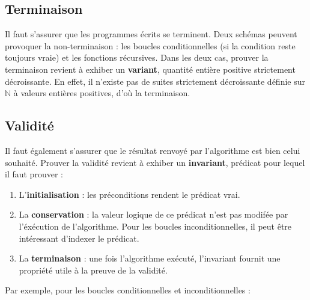 \documentclass{hibiscus}
\begin{document}
\subsection{Terminaison}

\par Il faut s'assurer que les programmes écrits se terminent. Deux schémas peuvent provoquer la non-terminaison : les boucles conditionnelles (si la condition reste toujours vraie) et les fonctions récursives. Dans les deux cas, prouver la terminaison revient à exhiber un \textbf{variant}, quantité entière positive strictement décroissante. En effet, il n'existe pas de suites strictement décroissante définie sur $\mathbb{N}$ à valeurs entières positives, d'où la terminaison.

\subsection{Validité}

Il faut également s'assurer que le résultat renvoyé par l'algorithme est bien celui souhaité. Prouver la validité revient à exhiber un \textbf{invariant}, prédicat pour lequel il faut prouver :

\medskip \begin{enumerate}
\item L'\textbf{initialisation} : les préconditions rendent le prédicat vrai.
\item La \textbf{conservation} : la valeur logique de ce prédicat n'est pas modifée par l'éxécution de l'algorithme. Pour les boucles inconditionnelles, il peut être intéressant d'indexer le prédicat.
\item La \textbf{terminaison} : une fois l'algorithme exécuté, l'invariant fournit une propriété utile à la preuve de la validité.
\end{enumerate}

\medskip \par Par exemple, pour les boucles conditionnelles et inconditionnelles :
\end{document}
